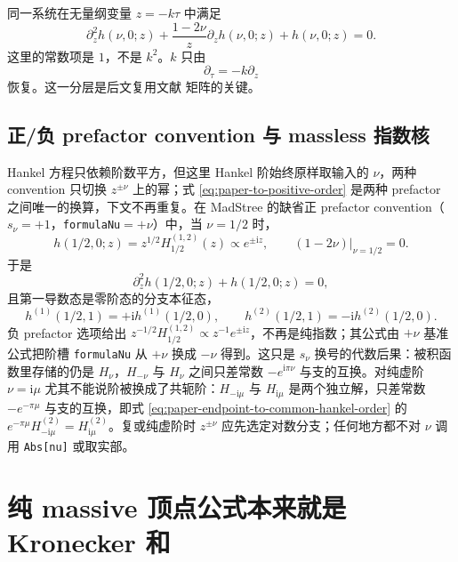 \documentclass[11pt,a4paper]{ctexart}
\newcommand{\ii}{\mathrm i}
\begin{document}
同一系统在无量纲变量 $z=-k\tau$ 中满足
\begin{equation}
 \partial_z^2h(\nu,0;z)
 +\frac{1-2\nu}{z}\partial_zh(\nu,0;z)
 +h(\nu,0;z)=0.
 \label{eq:h-dimensionless-eom}
\end{equation}
这里的常数项是 $1$，不是 $k^2$。$k$ 只由
\begin{equation}
 \partial_\tau=-k\partial_z
 \label{eq:tau-z-chain}
\end{equation}
恢复。这一分层是后文复用文献 \cite{Chen:2023eic} 矩阵的关键。

\subsection{正/负 prefactor convention 与 massless 指数核}

Hankel 方程只依赖阶数平方，但这里 Hankel 阶始终原样取输入的 $\nu$，两种 convention 只切换 $z^{\pm\nu}$ 上的幂；式 \eqref{eq:paper-to-positive-order} 是两种 prefactor 之间唯一的换算，下文不再重复。在 MadStree 的缺省正 prefactor convention（$s_\nu=+1$，\texttt{formulaNu}$=+\nu$）中，当 $\nu=1/2$ 时，
\begin{equation}
 h(1/2,0;z)=z^{1/2}H_{1/2}^{(1,2)}(z)
 \propto e^{\pm\ii z},
 \qquad
 \left.(1-2\nu)\right|_{\nu=1/2}=0.
 \label{eq:massless-h-eigenstate}
\end{equation}
于是
\begin{equation}
 \partial_z^2h(1/2,0;z)+h(1/2,0;z)=0,
 \label{eq:massless-z-eom}
\end{equation}
且第一导数态是零阶态的分支本征态，
\begin{equation}
 h^{(1)}(1/2,1)=+\ii h^{(1)}(1/2,0),
 \qquad
 h^{(2)}(1/2,1)=-\ii h^{(2)}(1/2,0).
 \label{eq:h-branch-eigenvalues}
\end{equation}
负 prefactor 选项给出 $z^{-1/2}H_{1/2}^{(1,2)}\propto z^{-1}e^{\pm\ii z}$，不再是纯指数；其公式由 $+\nu$ 基准公式把阶槽 \texttt{formulaNu} 从 $+\nu$ 换成 $-\nu$ 得到。这只是 $s_\nu$ 换号的代数后果：被积函数里存储的仍是 $H_\nu$，$H_{-\nu}$ 与 $H_\nu$ 之间只差常数 $-e^{\ii\pi\nu}$ 与支的互换。对纯虚阶 $\nu=\ii\mu$ 尤其不能说阶被换成了共轭阶：$H_{-\ii\mu}$ 与 $H_{\ii\mu}$ 是两个独立解，只差常数 $-e^{-\pi\mu}$ 与支的互换，即式 \eqref{eq:paper-endpoint-to-common-hankel-order} 的 $e^{-\pi\mu}H^{(2)}_{-\ii\mu}=H^{(2)}_{\ii\mu}$。复或纯虚阶时 $z^{\pm\nu}$ 应先选定对数分支；任何地方都不对 $\nu$ 调用 \texttt{Abs[nu]} 或取实部。

\section{纯 massive 顶点公式本来就是 Kronecker 和}
\end{document}
